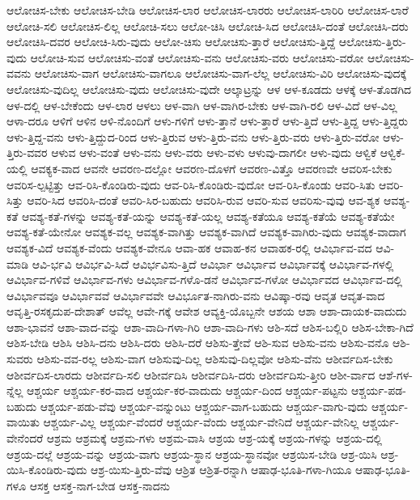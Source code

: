 {ಆಲೋಚಿಸ-ಬೇಕು
ಆಲೋಚಿಸ-ಬೇಡಿ
ಆಲೋಚಿಸ-ಲಾರ
ಆಲೋಚಿಸ-ಲಾರರು
ಆಲೋಚಿಸ-ಲಾರಿರಿ
ಆಲೋಚಿಸ-ಲಾರೆ
ಆಲೋಚಿ-ಸಲಿ
ಆಲೋಚಿಸ-ಲಿಲ್ಲ
ಆಲೋಚಿ-ಸಲು
ಆಲೋ-ಚಿಸಿ
ಆಲೋಚಿ-ಸಿದ
ಆಲೋಚಿಸಿ-ದಂತೆ
ಆಲೋಚಿಸಿ-ದರು
ಆಲೋಚಿಸಿ-ದವರ
ಆಲೋಚಿ-ಸಿರು-ವುದು
ಆಲೋ-ಚಿಸು
ಆಲೋಚಿಸು-ತ್ತಾರೆ
ಆಲೋಚಿಸು-ತ್ತಿದ್ದೆ
ಆಲೋಚಿಸು-ತ್ತಿರು-ವುದು
ಆಲೋಚಿ-ಸುವ
ಆಲೋಚಿಸು-ವಂತೆ
ಆಲೋಚಿಸು-ವನು
ಆಲೋಚಿಸು-ವರು
ಆಲೋಚಿಸು-ವರೋ
ಆಲೋಚಿಸು-ವವನು
ಆಲೋಚಿಸು-ವಾಗ
ಆಲೋಚಿಸು-ವಾಗಲೂ
ಆಲೋಚಿಸು-ವಾಗ-ಲೆಲ್ಲ
ಆಲೋಚಿಸು-ವಿರಿ
ಆಲೋಚಿಸು-ವುದಕ್ಕೆ
ಆಲೋಚಿಸು-ವುದಿಲ್ಲ
ಆಲೋಚಿಸು-ವುದು
ಆಲೋಚಿಸು-ವುದೇ
ಆಲ್ಕಾಟ್ರನ್ನು
ಆಳ
ಆಳ-ಕೂಡದು
ಆಳಕ್ಕೆ
ಆಳ-ತೊಡಗಿದ
ಆಳ-ದಲ್ಲಿ
ಆಳ-ಬೇಕೆಂದು
ಆಳ-ಲಾರ
ಆಳಲು
ಆಳ-ವಾಗಿ
ಆಳ-ವಾಗಿರ-ಬೇಕು
ಆಳ-ವಾಗಿ-ರಲಿ
ಆಳ-ವಿದೆ
ಆಳ-ವಿಲ್ಲ
ಆಳಾ-ದರೂ
ಆಳಿಗೆ
ಆಳಿನ
ಆಳಿ-ನೊಂದಿಗೆ
ಆಳು-ಗಳಿಗೆ
ಆಳು-ತ್ತಾನೆ
ಆಳು-ತ್ತಾರೆ
ಆಳು-ತ್ತಿದೆ
ಆಳು-ತ್ತಿದ್ದ
ಆಳು-ತ್ತಿದ್ದರು
ಆಳು-ತ್ತಿದ್ದ-ವನು
ಆಳು-ತ್ತಿದ್ದುದ-ರಿಂದ
ಆಳು-ತ್ತಿರುವ
ಆಳು-ತ್ತಿರು-ವನು
ಆಳು-ತ್ತಿರು-ವರು
ಆಳು-ತ್ತಿರು-ವರೋ
ಆಳು-ತ್ತಿರು-ವವರ
ಆಳುವ
ಆಳು-ವಂತೆ
ಆಳು-ವನು
ಆಳು-ವರು
ಆಳು-ವಳು
ಆಳುವು-ದಾಗಲೀ
ಆಳು-ವುದು
ಆಳ್ವಿಕೆ
ಆಳ್ವಿಕೆ-ಯಲ್ಲಿ
ಆವಕ್ಯಕ-ವಾದ
ಆವನೇ
ಆವರಣ-ದಲ್ಲೋ
ಆವರಣ-ದೊಳಗೆ
ಆವರಣ-ವಿತ್ತೊ
ಆವರಣವೇ
ಆವರಿಸ-ಬೇಕು
ಆವರಿಸ-ಲ್ಪಟ್ಟಿತ್ತು
ಆವ-ರಿಸಿ-ಕೊಂಡಿರು-ವುದು
ಆವ-ರಿಸಿ-ಕೊಂಡಿರು-ವುದೋ
ಆವ-ರಿಸಿ-ಕೊಂಡು
ಆವರಿ-ಸಿತು
ಆವರಿ-ಸಿತ್ತು
ಆವರಿ-ಸಿದ
ಆವರಿಸಿ-ದಂತೆ
ಆವರಿ-ಸಿರ-ಬಹುದು
ಆವರಿಸಿ-ರುವ
ಆವರಿ-ಸುವ
ಆವರಿಸು-ವುವು
ಆವ-ಶ್ಯಕ
ಆವಶ್ಯ-ಕತೆ
ಆವಶ್ಯ-ಕತೆ-ಗಳನ್ನು
ಆವಶ್ಯ-ಕತೆ-ಯನ್ನು
ಆವಶ್ಯ-ಕತೆ-ಯಲ್ಲ
ಆವಶ್ಯ-ಕತೆಯೂ
ಆವಶ್ಯ-ಕತೆಯೆ
ಆವಶ್ಯ-ಕತೆಯೇ
ಆವಶ್ಯ-ಕತೆ-ಯೇನೋ
ಆವಶ್ಯಕ-ವಲ್ಲ
ಆವಶ್ಯಕ-ವಾಗಿತ್ತು
ಆವಶ್ಯಕ-ವಾಗಿದೆ
ಆವಶ್ಯಕ-ವಾಗಿರು-ವುದು
ಆವಶ್ಯಕ-ವಾದಾಗ
ಆವಶ್ಯಕ-ವಿದೆ
ಆವಶ್ಯಕ-ವೆಂದು
ಆವಶ್ಯಕ-ವೇನೂ
ಆವಾ-ಹಕ
ಆವಾಹ-ಕನ
ಆವಾಹಕ-ರಲ್ಲಿ
ಆವಿರ್ಭಾವ-ವದ
ಆವಿ-ಮಾಡಿ
ಆವಿ-ರ್ಭವಿ
ಆವಿರ್ಭವಿ-ಸಿದೆ
ಆವಿರ್ಭವಿಸು-ತ್ತಿದೆ
ಆವಿರ್ಭಾ
ಆವಿರ್ಭಾವ
ಆವಿರ್ಭಾವಕ್ಕೆ
ಆವಿರ್ಭಾವ-ಗಳಲ್ಲಿ
ಆವಿರ್ಭಾವ-ಗಳಿವೆ
ಆವಿರ್ಭಾವ-ಗಳು
ಆವಿರ್ಭಾವ-ಗಳೊ-ಡನೆ
ಆವಿರ್ಭಾವ-ಗಳೋ
ಆವಿರ್ಭಾವದ
ಆವಿರ್ಭಾವ-ದಲ್ಲಿ
ಆವಿರ್ಭಾವವೂ
ಆವಿರ್ಭಾವವೆ
ಆವಿರ್ಭಾವವೇ
ಆವಿರ್ಭೂತ-ನಾಗಿರು-ವನು
ಆವಿಷ್ಕಾ-ರವು
ಆವೃತ
ಆವೃತ-ವಾದ
ಆವೃತ್ತಿ-ರಸಕೃದುಪ-ದೇಶಾತ್
ಆವೆಲ್ಲ
ಆವೇ-ಗಕ್ಕೆ
ಆವೇಶ
ಆವ್ಯಕ್ತಿ-ಯೊಬ್ಬನೇ
ಆಶಯ
ಆಶಾ
ಆಶಾ-ದಾಯಕ-ವಾದುದು
ಆಶಾ-ಭಾವನೆ
ಆಶಾ-ವಾದ-ವನ್ನು
ಆಶಾ-ವಾದಿ-ಗಳಾ-ಗಿರಿ
ಆಶಾ-ವಾದಿ-ಗಳು
ಆಶಿ-ಸದೆ
ಆಶಿಸ-ಬಲ್ಲಿರಿ
ಆಶಿಸ-ಬೇಕಾ-ಗಿದೆ
ಆಶಿಸ-ಬೇಡಿ
ಆಶಿಸಿ
ಆಶಿಸಿ-ದನು
ಆಶಿಸಿ-ದರು
ಆಶಿಸಿ-ದರೆ
ಆಶಿಸು-ತ್ತೇವೆ
ಆಶಿ-ಸುವ
ಆಶಿಸು-ವನು
ಆಶಿಸು-ವನೊ
ಆಶಿ-ಸುವರು
ಆಶಿಸು-ವವ-ರಲ್ಲ
ಆಶಿಸು-ವಾಗ
ಆಶಿಸುವು-ದಿಲ್ಲ
ಆಶಿಸುವು-ದಿಲ್ಲವೋ
ಆಶಿಸು-ವೆನು
ಆಶೀರ್ವದಿಸ-ಬೇಕು
ಆಶೀರ್ವದಿಸ-ಲಾರದು
ಆಶೀರ್ವದಿ-ಸಲಿ
ಆಶೀರ್ವದಿಸಿ
ಆಶೀರ್ವದಿಸಿ-ದರು
ಆಶೀರ್ವದಿಸು-ತ್ತೀರಿ
ಆಶೀ-ರ್ವಾದ
ಆಶೆ-ಗಳ-ನ್ನೆಲ್ಲ
ಆಶ್ಚರ್ಯ
ಆಶ್ಚರ್ಯ-ಕರ-ವಾದ
ಆಶ್ಚರ್ಯ-ಕರ-ವಾದುದು
ಆಶ್ಚರ್ಯ-ದಿಂದ
ಆಶ್ಚರ್ಯ-ಪಟ್ಟನು
ಆಶ್ಚರ್ಯ-ಪಡ-ಬಹುದು
ಆಶ್ಚರ್ಯ-ಪಡು-ವೆವು
ಆಶ್ಚರ್ಯ-ವನ್ನುಂಟು
ಆಶ್ಚರ್ಯ-ವಾಗ-ಬಹುದು
ಆಶ್ಚರ್ಯ-ವಾಗು-ವುದು
ಆಶ್ಚರ್ಯ-ವಾಯಿತು
ಆಶ್ಚರ್ಯ-ವಿಲ್ಲ
ಆಶ್ಚರ್ಯ-ವೆಂದರೆ
ಆಶ್ಚರ್ಯ-ವೆಂದು
ಆಶ್ಚರ್ಯ-ವೇನಿದೆ
ಆಶ್ಚರ್ಯ-ವೇನಿಲ್ಲ
ಆಶ್ಚರ್ಯ-ವೇನೆಂದರೆ
ಆಶ್ರಮ
ಆಶ್ರಮಕ್ಕೆ
ಆಶ್ರಮ-ಗಳು
ಆಶ್ರಮ-ವಾಸಿ
ಆಶ್ರಯ
ಆಶ್ರ-ಯಕ್ಕೆ
ಆಶ್ರಯ-ಗಳನ್ನು
ಆಶ್ರಯ-ದಲ್ಲಿ
ಆಶ್ರಯ-ದಲ್ಲೆ
ಆಶ್ರಯ-ವನ್ನು
ಆಶ್ರಯ-ವಾಗು
ಆಶ್ರಯ-ಸ್ಥಾನ
ಆಶ್ರಯ-ಸ್ಥಾನವೋ
ಆಶ್ರಯಿಸ-ಬೇಡಿ
ಆಶ್ರ-ಯಿಸಿ
ಆಶ್ರ-ಯಿಸಿ-ಕೊಂಡಿರು-ವುದು
ಆಶ್ರ-ಯಿಸು-ತ್ತಿರು-ವೆವು
ಆಶ್ರಿತ
ಆಶ್ರಿತ-ರನ್ನಾಗಿ
ಆಷಾಢ-ಭೂತಿ-ಗಳಾ-ಗಿಯೂ
ಆಷಾಢ-ಭೂತಿ-ಗಳೂ
ಆಸಕ್ತ
ಆಸಕ್ತ-ನಾಗ-ಬೇಡ
ಆಸಕ್ತ-ನಾದನು
}
